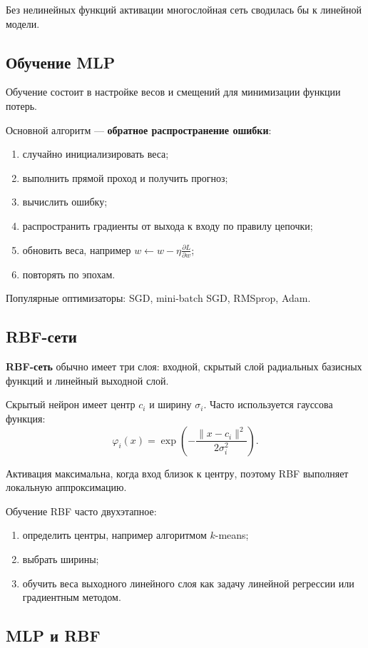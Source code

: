 Без нелинейных функций активации многослойная сеть сводилась бы к линейной модели.

\subsection*{Обучение MLP}

Обучение состоит в настройке весов и смещений для минимизации функции потерь.

Основной алгоритм --- \textbf{обратное распространение ошибки}:
\begin{enumerate}
    \item случайно инициализировать веса;
    \item выполнить прямой проход и получить прогноз;
    \item вычислить ошибку;
    \item распространить градиенты от выхода к входу по правилу цепочки;
    \item обновить веса, например $w\leftarrow w-\eta \frac{\partial L}{\partial w}$;
    \item повторять по эпохам.
\end{enumerate}

Популярные оптимизаторы: SGD, mini-batch SGD, RMSprop, Adam.

\subsection*{RBF-сети}

\textbf{RBF-сеть} обычно имеет три слоя: входной, скрытый слой радиальных базисных функций и линейный выходной слой.

Скрытый нейрон имеет центр $c_i$ и ширину $\sigma_i$. Часто используется гауссова функция:
\[
\varphi_i(x)=\exp\left(-\frac{\|x-c_i\|^2}{2\sigma_i^2}\right).
\]

Активация максимальна, когда вход близок к центру, поэтому RBF выполняет локальную аппроксимацию.

Обучение RBF часто двухэтапное:
\begin{enumerate}
    \item определить центры, например алгоритмом $k$-means;
    \item выбрать ширины;
    \item обучить веса выходного линейного слоя как задачу линейной регрессии или градиентным методом.
\end{enumerate}

\subsection*{MLP и RBF}

